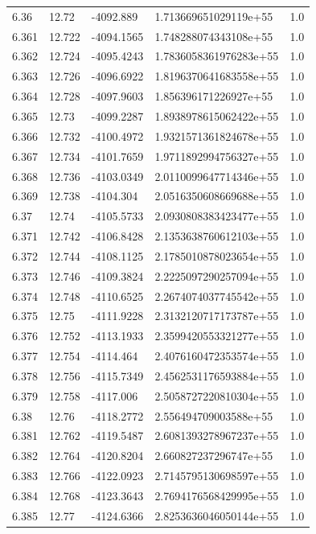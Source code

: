 \begin{tabular}{lllll}
6.36 & 12.72 & -4092.889 & 1.713669651029119e+55 & 1.0 \\
6.361 & 12.722 & -4094.1565 & 1.748288074343108e+55 & 1.0 \\
6.362 & 12.724 & -4095.4243 & 1.7836058361976283e+55 & 1.0 \\
6.363 & 12.726 & -4096.6922 & 1.8196370641683558e+55 & 1.0 \\
6.364 & 12.728 & -4097.9603 & 1.856396171226927e+55 & 1.0 \\
6.365 & 12.73 & -4099.2287 & 1.8938978615062422e+55 & 1.0 \\
6.366 & 12.732 & -4100.4972 & 1.9321571361824678e+55 & 1.0 \\
6.367 & 12.734 & -4101.7659 & 1.9711892994756327e+55 & 1.0 \\
6.368 & 12.736 & -4103.0349 & 2.0110099647714346e+55 & 1.0 \\
6.369 & 12.738 & -4104.304 & 2.0516350608669688e+55 & 1.0 \\
6.37 & 12.74 & -4105.5733 & 2.0930808383423477e+55 & 1.0 \\
6.371 & 12.742 & -4106.8428 & 2.1353638760612103e+55 & 1.0 \\
6.372 & 12.744 & -4108.1125 & 2.1785010878023654e+55 & 1.0 \\
6.373 & 12.746 & -4109.3824 & 2.2225097290257094e+55 & 1.0 \\
6.374 & 12.748 & -4110.6525 & 2.2674074037745542e+55 & 1.0 \\
6.375 & 12.75 & -4111.9228 & 2.3132120717173787e+55 & 1.0 \\
6.376 & 12.752 & -4113.1933 & 2.3599420553321277e+55 & 1.0 \\
6.377 & 12.754 & -4114.464 & 2.4076160472353574e+55 & 1.0 \\
6.378 & 12.756 & -4115.7349 & 2.4562531176593884e+55 & 1.0 \\
6.379 & 12.758 & -4117.006 & 2.5058727220810304e+55 & 1.0 \\
6.38 & 12.76 & -4118.2772 & 2.556494709003588e+55 & 1.0 \\
6.381 & 12.762 & -4119.5487 & 2.6081393278967237e+55 & 1.0 \\
6.382 & 12.764 & -4120.8204 & 2.660827237296747e+55 & 1.0 \\
6.383 & 12.766 & -4122.0923 & 2.7145795130698597e+55 & 1.0 \\
6.384 & 12.768 & -4123.3643 & 2.7694176568429995e+55 & 1.0 \\
6.385 & 12.77 & -4124.6366 & 2.8253636046050144e+55 & 1.0 \\

\end{tabular}
